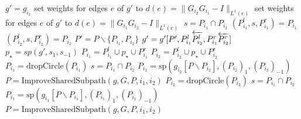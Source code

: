 \documentclass[reqno]{amsart}
\let\join\relax
\DeclareMathOperator{\join}{\dot{+}}
\begin{document}
\begin{algorithm}[ht]
	\caption{Improve Paths with a Shared Subpath}\label{algo:improvePath}
	\begin{algorithmic}[1]
			\State $g' = g_{i_1}$ 		
				\State set weights for edges $e$ of $g'$ to $d(e) = \| G_{i_2} G_{i_1}  - I \|_{L^1(e)}$
			\EndIf
				\State set weights for edges $e$ of $g'$ to $d(e) = \| G_{i_1} G_{i_2}  - I \|_{L^1(e)}$
			\EndIf
			\State $s = P_{i_1} \cap P_{i_2}$      \label{line:restrictionsStart}
			\State $(P^l_{i_1}, s, P^r_{i_1}) = P_{i_1}$
			\State $(P^l_{i_2}, s, P^r_{i_2}) = P_{i_2}$
			\State $P' = P \backslash \{P_{i_1},P_{i_2}\}$
			\State $g' = g'[P',P^l_{i_1} \join \overleftarrow{P^l_{i_2}}, P^r_{i_1} \join \overleftarrow{P^r_{i_2}}]$ \label{line:restrictionsEnd}
			\State $p_\star = sp(g',s_1,s_{-1})$  \label{line:shortestPath} 
			\State $P_{i_1} = P^l_{i_1} \cup p_\star \cup P^r_{i_1}$
			\State $P_{i_2} = P^l_{i_2} \cup p_\star \cup P^r_{i_2}$
			 \label{line:recursionStart}	
				\State $P_{i_1} = \text{dropCircle}(P_{i_1})$
				\State $s = P_{i_1} \cap P_{i_2}$
				\State $P_{i_2} = \text{sp}(g_{i_2}[ P \backslash P_{i_2}],(P_{i_2})_1,(P_{i_2})_{-1})$
					\State $P = \text{ImproveSharedSubpath}(g,G,P,i_1,i_2)$
				\EndIf
				\State $P_{i_2} = \text{dropCircle}(P_{i_2})$
				\State $s = P_{i_1} \cap P_{i_2}$
				\State $P_{i_1} = \text{sp}(g_{i_1}[ P \backslash P_{i_1}],(P_{i_1})_1,(P_{i_1})_{-1})$
					\State $P = \text{ImproveSharedSubpath}(g,G,P,i_1,i_2)$
				\EndIf
			\EndIf 			      \label{line:recursionEnd}
			\State {}
		\EndProcedure
	\end{algorithmic}
\end{algorithm}
\end{document}
